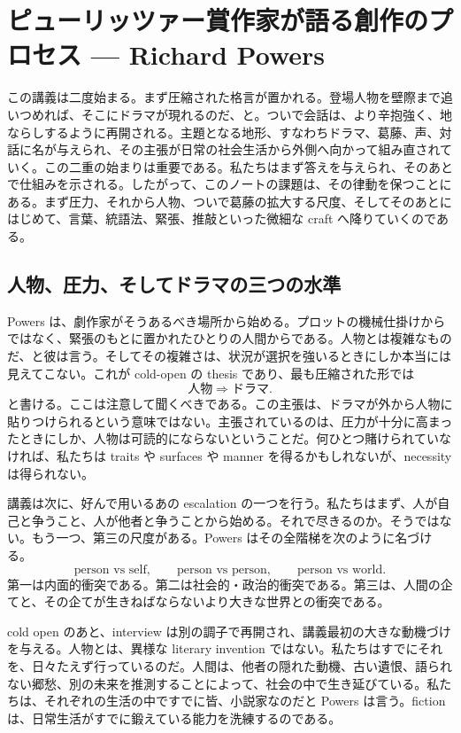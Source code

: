 \chapter{ピューリッツァー賞作家が語る創作のプロセス --- Richard Powers}

この講義は二度始まる。まず圧縮された格言が置かれる。登場人物を壁際まで追いつめれば、そこにドラマが現れるのだ、と。ついで会話は、より辛抱強く、地ならしするように再開される。主題となる地形、すなわちドラマ、葛藤、声、対話に名が与えられ、その主張が日常の社会生活から外側へ向かって組み直されていく。この二重の始まりは重要である。私たちはまず答えを与えられ、そのあとで仕組みを示される。したがって、このノートの課題は、その律動を保つことにある。まず圧力、それから人物、ついで葛藤の拡大する尺度、そしてそのあとにはじめて、言葉、統語法、緊張、推敲といった微細な craft へ降りていくのである。

\section{人物、圧力、そしてドラマの三つの水準}

Powers は、劇作家がそうあるべき場所から始める。プロットの機械仕掛けからではなく、緊張のもとに置かれたひとりの人間からである。人物とは複雑なものだ、と彼は言う。そしてその複雑さは、状況が選択を強いるときにしか本当には見えてこない。これが cold-open の thesis であり、最も圧縮された形では
\begin{equation}
\text{人物} \Rightarrow \text{ドラマ}.
\end{equation}
と書ける。ここは注意して聞くべきである。この主張は、ドラマが外から人物に貼りつけられるという意味ではない。主張されているのは、圧力が十分に高まったときにしか、人物は可読的にならないということだ。何ひとつ賭けられていなければ、私たちは traits や surfaces や manner を得るかもしれないが、necessity は得られない。

講義は次に、好んで用いるあの escalation の一つを行う。私たちはまず、人が自己と争うこと、人が他者と争うことから始める。それで尽きるのか。そうではない。もう一つ、第三の尺度がある。Powers はその全階梯を次のように名づける。
\begin{equation}
\text{person vs self},\qquad \text{person vs person},\qquad \text{person vs world}.
\end{equation}
第一は内面的衝突である。第二は社会的・政治的衝突である。第三は、人間の企てと、その企てが生きねばならないより大きな世界との衝突である。

cold open のあと、interview は別の調子で再開され、講義最初の大きな動機づけを与える。人物とは、異様な literary invention ではない。私たちはすでにそれを、日々たえず行っているのだ。人間は、他者の隠れた動機、古い遺恨、語られない郷愁、別の未来を推測することによって、社会の中で生き延びている。私たちは、それぞれの生活の中ですでに皆、小説家なのだと Powers は言う。fiction は、日常生活がすでに鍛えている能力を洗練するのである。

